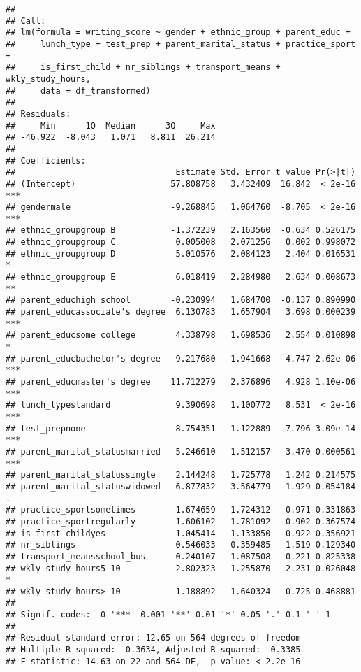 \documentclass[
  12pt,
]{article}
\begin{document}
\begin{verbatim}
## 
## Call:
## lm(formula = writing_score ~ gender + ethnic_group + parent_educ + 
##     lunch_type + test_prep + parent_marital_status + practice_sport + 
##     is_first_child + nr_siblings + transport_means + wkly_study_hours, 
##     data = df_transformed)
## 
## Residuals:
##     Min      1Q  Median      3Q     Max 
## -46.922  -8.043   1.071   8.811  26.214 
## 
## Coefficients:
##                                Estimate Std. Error t value Pr(>|t|)    
## (Intercept)                   57.808758   3.432409  16.842  < 2e-16 ***
## gendermale                    -9.268845   1.064760  -8.705  < 2e-16 ***
## ethnic_groupgroup B           -1.372239   2.163560  -0.634 0.526175    
## ethnic_groupgroup C            0.005008   2.071256   0.002 0.998072    
## ethnic_groupgroup D            5.010576   2.084123   2.404 0.016531 *  
## ethnic_groupgroup E            6.018419   2.284980   2.634 0.008673 ** 
## parent_educhigh school        -0.230994   1.684700  -0.137 0.890990    
## parent_educassociate's degree  6.130783   1.657904   3.698 0.000239 ***
## parent_educsome college        4.338798   1.698536   2.554 0.010898 *  
## parent_educbachelor's degree   9.217680   1.941668   4.747 2.62e-06 ***
## parent_educmaster's degree    11.712279   2.376896   4.928 1.10e-06 ***
## lunch_typestandard             9.390698   1.100772   8.531  < 2e-16 ***
## test_prepnone                 -8.754351   1.122889  -7.796 3.09e-14 ***
## parent_marital_statusmarried   5.246610   1.512157   3.470 0.000561 ***
## parent_marital_statussingle    2.144248   1.725778   1.242 0.214575    
## parent_marital_statuswidowed   6.877832   3.564779   1.929 0.054184 .  
## practice_sportsometimes        1.674659   1.724312   0.971 0.331863    
## practice_sportregularly        1.606102   1.781092   0.902 0.367574    
## is_first_childyes              1.045414   1.133850   0.922 0.356921    
## nr_siblings                    0.546033   0.359485   1.519 0.129340    
## transport_meansschool_bus      0.240107   1.087508   0.221 0.825338    
## wkly_study_hours5-10           2.802323   1.255870   2.231 0.026048 *  
## wkly_study_hours> 10           1.188892   1.640324   0.725 0.468881    
## ---
## Signif. codes:  0 '***' 0.001 '**' 0.01 '*' 0.05 '.' 0.1 ' ' 1
## 
## Residual standard error: 12.65 on 564 degrees of freedom
## Multiple R-squared:  0.3634, Adjusted R-squared:  0.3385 
## F-statistic: 14.63 on 22 and 564 DF,  p-value: < 2.2e-16
\end{verbatim}
\end{document}
